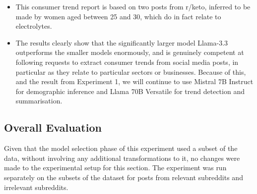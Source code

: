 \documentclass{report}
\begin{document}
\begin{itemize}
\begin{listing}[H]
\centering
\begin{minipage}{\linewidth}
\begin{lstlisting}[style=promptstyle]
{
"label": "electrolyte_importance",
"evidence": ["d014oyg", "d0lqtt3"],
"reasoning": "The trend is relevant to Coca-Cola as it highlights the importance of electrolytes in hydration, which could be applied to existing or new beverages.",
"summary": "Female consumers aged 25-30 are prioritizing electrolytes for hydration, which could be an opportunity for Coca-Cola to develop or promote drinks that cater to this need. This trend is supported by posts d014oyg and d0lqtt3, indicating a growing interest in the role of electrolytes in maintaining proper hydration levels."
}
\end{lstlisting}
\end{minipage}
\caption{Example of a consumer trend report produced by Llama 70B Versatile},
\end{listing}


\item This consumer trend report is based on two posts from r/keto, inferred to be made by women aged between 25 and 30, which do in fact relate to electrolytes.

\item The results clearly show that the significantly larger model Llama-3.3 outperforms the smaller models enormously, and is genuinely competent at following requests to extract consumer trends from social media posts, in particular as they relate to particular sectors or businesses. Because of this, and the result from Experiment 1, we will continue to use Mistral 7B Instruct for demographic inference and Llama 70B Versatile for trend detection and summarisation.
\end{itemize}

\subsection{Overall Evaluation}

Given that the model selection phase of this experiment used a subset of the data, without involving any additional transformations to it, no changes were made to the experimental setup for this section. The experiment was run separately on the subsets of the dataset for posts from relevant subreddits and irrelevant subreddits.
\end{document}

